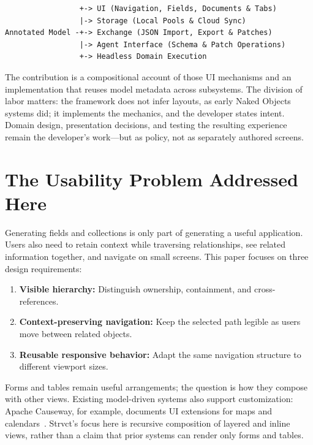 \documentclass[sigplan,review,anonymous,10pt]{acmart}
\begin{document}
\begin{scriptsize}
\begin{verbatim}
                 +-> UI (Navigation, Fields, Documents & Tabs)
                 |-> Storage (Local Pools & Cloud Sync)
Annotated Model -+-> Exchange (JSON Import, Export & Patches)
                 |-> Agent Interface (Schema & Patch Operations)
                 +-> Headless Domain Execution
\end{verbatim}
\end{scriptsize}

The contribution is a compositional account of those UI mechanisms and an implementation that reuses model metadata across subsystems. The division of labor matters: the framework does not infer layouts, as early Naked Objects systems did; it implements the mechanics, and the developer states intent. Domain design, presentation decisions, and testing the resulting experience remain the developer's work---but as policy, not as separately authored screens.

\section{The Usability Problem Addressed Here}
\label{sec:gap}

Generating fields and collections is only part of generating a useful application. Users also need to retain context while traversing relationships, see related information together, and navigate on small screens. This paper focuses on three design requirements:

\begin{enumerate}
\item \textbf{Visible hierarchy:} Distinguish ownership, containment, and cross-references.
\item \textbf{Context-preserving navigation:} Keep the selected path legible as users move between related objects.
\item \textbf{Reusable responsive behavior:} Adapt the same navigation structure to different viewport sizes.
\end{enumerate}

Forms and tables remain useful arrangements; the question is how they compose with other views. Existing model-driven systems also support customization: Apache Causeway, for example, documents UI extensions for maps and calendars~\cite{causeway}. Strvct's focus here is recursive composition of layered and inline views, rather than a claim that prior systems can render only forms and tables.
\end{document}
